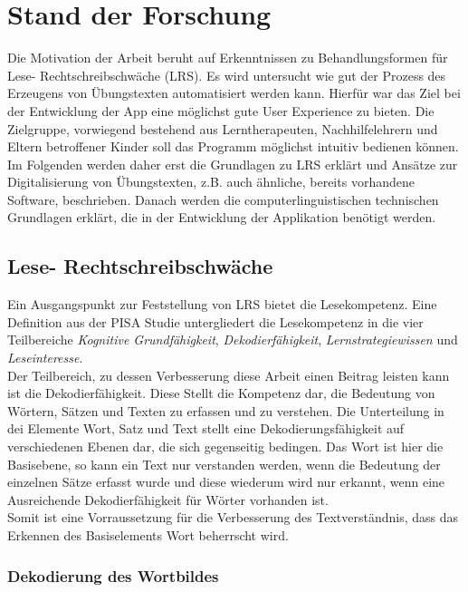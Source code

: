 
\chapter{Stand der Forschung}

Die Motivation der Arbeit beruht auf Erkenntnissen zu Behandlungsformen für Lese- Rechtschreibschwäche (LRS). Es wird untersucht wie gut der Prozess des Erzeugens von Übungstexten automatisiert werden kann. Hierfür war das Ziel bei der Entwicklung der App eine möglichst gute User Experience zu bieten. Die Zielgruppe, vorwiegend bestehend aus Lerntherapeuten, Nachhilfelehrern und Eltern betroffener Kinder soll das Programm möglichst intuitiv bedienen können.\\
Im Folgenden werden daher erst die Grundlagen zu LRS erklärt und Ansätze zur Digitalisierung von Übungstexten, z.B. auch ähnliche, bereits vorhandene Software, beschrieben. Danach werden die computerlinguistischen technischen Grundlagen erklärt, die in der Entwicklung der Applikation benötigt werden.

\section{Lese- Rechtschreibschwäche}

Ein Ausgangspunkt zur Feststellung von LRS bietet die Lesekompetenz. Eine Definition aus der PISA Studie  untergliedert die Lesekompetenz in die vier Teilbereiche \textit{Kognitive Grundfähigkeit}, \textit{Dekodierfähigkeit}, \textit{Lernstrategiewissen} und \textit{Leseinteresse}.\\
Der Teilbereich, zu dessen Verbesserung diese Arbeit einen Beitrag leisten kann ist die Dekodierfähigkeit. Diese Stellt die Kompetenz dar, die Bedeutung von Wörtern, Sätzen und Texten zu erfassen und zu verstehen. Die Unterteilung in dei Elemente Wort, Satz und Text stellt eine Dekodierungsfähigkeit auf verschiedenen Ebenen dar, die sich gegenseitig bedingen. Das Wort ist hier die Basisebene, so kann ein Text nur verstanden werden, wenn die Bedeutung der einzelnen Sätze erfasst wurde und diese wiederum wird nur erkannt, wenn eine Ausreichende Dekodierfähigkeit für Wörter vorhanden ist.\\
Somit ist eine Vorraussetzung für die Verbesserung des Textverständnis, dass das Erkennen des Basiselements Wort beherrscht wird.

\subsection{Dekodierung des Wortbildes}


